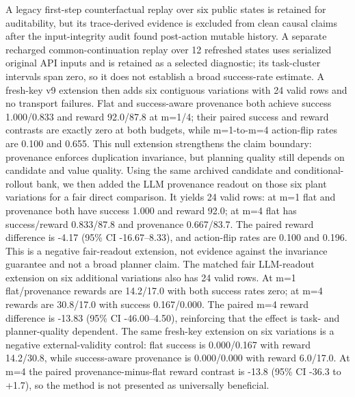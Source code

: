 \documentclass[10pt]{article}
\begin{document}
A legacy first-step counterfactual replay over six public states is retained for auditability, but its trace-derived evidence is excluded from clean causal claims after the input-integrity audit found post-action mutable history. A separate recharged common-continuation replay over 12 refreshed states uses serialized original API inputs and is retained as a selected diagnostic; its task-cluster intervals span zero, so it does not establish a broad success-rate estimate. A fresh-key v9 extension then adds six contiguous \texttt{} variations with 24 valid rows and no transport failures. Flat and success-aware provenance both achieve success 1.000/0.833 and reward 92.0/87.8 at m=1/4; their paired success and reward contrasts are exactly zero at both budgets, while m=1-to-m=4 action-flip rates are 0.100 and 0.655. This null extension strengthens the claim boundary: provenance enforces duplication invariance, but planning quality still depends on candidate and value quality. Using the same archived candidate and conditional-rollout bank, we then added the LLM provenance readout on those six plant variations for a fair direct comparison. It yields 24 valid rows: at m=1 flat and provenance both have success 1.000 and reward 92.0; at m=4 flat has success/reward 0.833/87.8 and provenance 0.667/83.7. The paired reward difference is -4.17 (95\% CI -16.67--8.33), and action-flip rates are 0.100 and 0.196. This is a negative fair-readout extension, not evidence against the invariance guarantee and not a broad planner claim. The matched fair LLM-readout extension on six additional \texttt{} variations also has 24 valid rows. At m=1 flat/provenance rewards are 14.2/17.0 with both success rates zero; at m=4 rewards are 30.8/17.0 with success 0.167/0.000. The paired m=4 reward difference is -13.83 (95\% CI -46.00--4.50), reinforcing that the effect is task- and planner-quality dependent. The same fresh-key extension on six \texttt{} variations is a negative external-validity control: flat success is 0.000/0.167 with reward 14.2/30.8, while success-aware provenance is 0.000/0.000 with reward 6.0/17.0. At m=4 the paired provenance-minus-flat reward contrast is -13.8 (95\% CI -36.3 to +1.7), so the method is not presented as universally beneficial.
\end{document}
